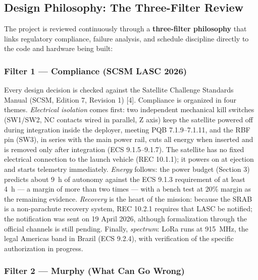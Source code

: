 \subsection{Design Philosophy: The Three-Filter Review}

The project is reviewed continuously through a \textbf{three-filter
philosophy} that links regulatory compliance, failure analysis, and
schedule discipline directly to the code and hardware being built:

\subsubsection{Filter 1 — Compliance (SCSM LASC 2026)}

Every design decision is checked against the Satellite Challenge
Standards Manual (SCSM, Edition 7, Revision 1) [4]. Compliance is
organized in four themes. \emph{Electrical isolation} comes first: two
independent mechanical kill switches (SW1/SW2, NC contacts wired in
parallel, Z axis) keep the satellite powered off during integration inside the deployer, meeting
PQB 7.1.9--7.1.11, and the RBF pin (SW3), in series with the main power
rail, cuts all energy when inserted and is removed only after
integration (ECS 9.1.5--9.1.7). The satellite has no fixed electrical
connection to the launch vehicle (REC 10.1.1); it powers on at ejection
and starts telemetry immediately. \emph{Energy} follows: the power
budget (Section 3) predicts about 9~h of autonomy against the ECS 9.1.3
requirement of at least 4~h --- a margin of more than two times --- with
a bench test at 20\% margin as the remaining evidence.
\emph{Recovery} is the heart of the mission: because the SRAB is a
non-parachute recovery system, REC 10.2.1 requires that LASC be
notified; the notification was sent on 19 April 2026, although
formalization through the official channels is still pending.
Finally, \emph{spectrum}: LoRa runs at 915~MHz, the legal Americas
band in Brazil (ECS 9.2.4), with verification of the specific
authorization in progress.

\subsubsection{Filter 2 — Murphy (What Can Go Wrong)}

